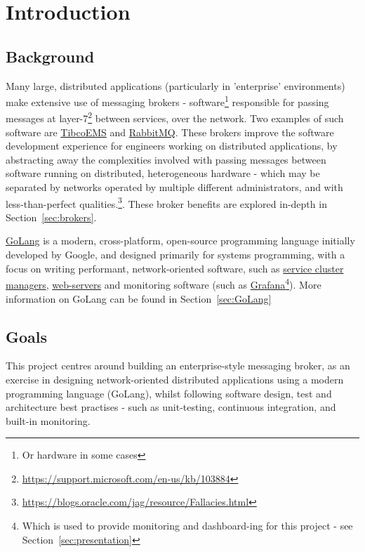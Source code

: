 \chapter{Introduction}
\label{chap:Introduction}

\section{Background}
\label{sec:background}

Many large, distributed applications (particularly in 'enterprise' environments)
make extensive use of messaging brokers - software\footnote{Or hardware in some
cases\cite{solaceappliances}} responsible for passing messages at
layer-7\footnote{\url{https://support.microsoft.com/en-us/kb/103884}} between
services, over the network. Two examples of such software are
\href{http://www.tibco.com/products/automation/enterprise-messaging/enterprise-message-service}{TibcoEMS}
and \href{https://www.rabbitmq.com/}{RabbitMQ}. These brokers improve the
software development experience for engineers working on distributed
applications, by abstracting away the complexities involved with passing
messages between software running on distributed, heterogeneous hardware - which
may be separated by networks operated by multiple different administrators, and
with less-than-perfect
qualities.\footnote{\url{https://blogs.oracle.com/jag/resource/Fallacies.html}}.
These broker benefits are explored in-depth in Section~\ref{sec:brokers}.

\href{https://golang.org/}{GoLang} is a modern, cross-platform, open-source
programming language initially developed by Google, and designed primarily for
systems programming, with a focus on writing performant, network-oriented
software, such as \href{https://github.com/kubernetes/kubernetes}{service
cluster managers}, \href{https://github.com/mholt/caddy}{web-servers} and
monitoring software (such as
\href{https://github.com/grafana/grafana}{Grafana}\footnote{Which is used to
provide monitoring and dashboard-ing for this project - see
Section~\ref{sec:presentation}}). More information on GoLang can be found in
Section~\ref{sec:GoLang}

\section{Goals}
This project centres around building an enterprise-style messaging broker, as an
exercise in designing network-oriented distributed applications using a modern
programming language (GoLang), whilst following software design, test and
architecture best practises - such as unit-testing, continuous integration, and
built-in monitoring.


